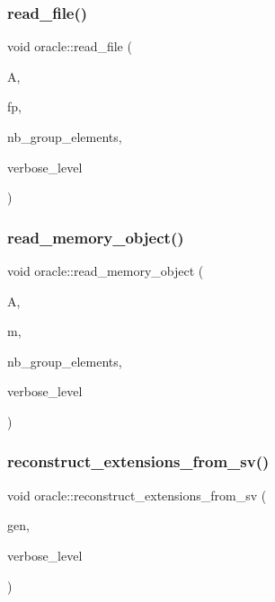 \subsubsection{\texorpdfstring{read\+\_\+file()}{read\_file()}}
{\footnotesize\ttfamily void oracle\+::read\+\_\+file (\begin{DoxyParamCaption}\item[{\mbox{\hyperlink{classaction}{action}} $\ast$}]{A,  }\item[{F\+I\+LE $\ast$}]{fp,  }\item[{\mbox{\hyperlink{galois_8h_a09fddde158a3a20bd2dcadb609de11dc}{I\+NT}} \&}]{nb\+\_\+group\+\_\+elements,  }\item[{\mbox{\hyperlink{galois_8h_a09fddde158a3a20bd2dcadb609de11dc}{I\+NT}}}]{verbose\+\_\+level }\end{DoxyParamCaption})}

\mbox{\label{classoracle_af40f5b470a06d88dde9a9fc90a90b2e7}} 
\subsubsection{\texorpdfstring{read\+\_\+memory\+\_\+object()}{read\_memory\_object()}}
{\footnotesize\ttfamily void oracle\+::read\+\_\+memory\+\_\+object (\begin{DoxyParamCaption}\item[{\mbox{\hyperlink{classaction}{action}} $\ast$}]{A,  }\item[{\mbox{\hyperlink{classmemory__object}{memory\+\_\+object}} $\ast$}]{m,  }\item[{\mbox{\hyperlink{galois_8h_a09fddde158a3a20bd2dcadb609de11dc}{I\+NT}} \&}]{nb\+\_\+group\+\_\+elements,  }\item[{\mbox{\hyperlink{galois_8h_a09fddde158a3a20bd2dcadb609de11dc}{I\+NT}}}]{verbose\+\_\+level }\end{DoxyParamCaption})}

\mbox{\label{classoracle_aedc4bf96551d4db582078917fe15aae6}} 
\subsubsection{\texorpdfstring{reconstruct\+\_\+extensions\+\_\+from\+\_\+sv()}{reconstruct\_extensions\_from\_sv()}}
{\footnotesize\ttfamily void oracle\+::reconstruct\+\_\+extensions\+\_\+from\+\_\+sv (\begin{DoxyParamCaption}\item[{\mbox{\hyperlink{classgenerator}{generator}} $\ast$}]{gen,  }\item[{\mbox{\hyperlink{galois_8h_a09fddde158a3a20bd2dcadb609de11dc}{I\+NT}}}]{verbose\+\_\+level }\end{DoxyParamCaption})}

